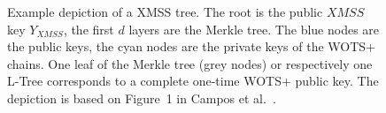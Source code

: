 \begin{figure}
\caption{Example depiction of a XMSS tree. The root is the public $XMSS$ key $Y_{XMSS}$, the first $d$ layers are the Merkle tree. The \textcolor{darkblue_tud}{blue nodes} are the public keys, the \textcolor{cyan_tud}{cyan nodes} are the private keys of the WOTS+ chains. One leaf of the Merkle tree (\textcolor{grey_tud}{grey nodes}) or respectively one L-Tree corresponds to a complete one-time WOTS+ public key.
The depiction is based on Figure~1 in Campos et al.~\cite{fabio_paper_lms_vs_xmss}.} %
\label{img:xmss_tree}
\end{figure}


%	
%
%
%
%

